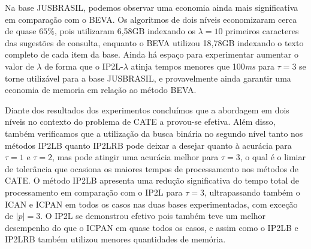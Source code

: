 Na base JUSBRASIL, podemos observar uma economia ainda mais significativa em comparação com o BEVA. Os algoritmos de dois níveis economizaram cerca de quase $65\%$, pois utilizaram 6,58GB indexando os $\lambda=10$ primeiros caracteres das sugestões de consulta, enquanto o BEVA utilizou 18,78GB indexando o texto completo de cada item da base. Ainda há espaço para experimentar aumentar o valor de $\lambda$ de forma que o IP2L-$\lambda$ atinja tempos menores que 100\textit{ms} para $\tau=3$ se torne utilizável para a base JUSBRASIL, e provavelmente ainda garantir uma economia de memoria em relação ao método BEVA. 

Diante dos resultados dos experimentos concluímos que a abordagem em dois níveis no contexto do problema de CATE a provou-se efetiva. Além disso, também verificamos que a utilização da busca binária no segundo nível tanto nos métodos IP2LB quanto IP2LRB pode deixar a desejar quanto à acurácia para $\tau=1$ e $\tau=2$, mas pode atingir uma acurácia melhor para $\tau=3$, o qual é o limiar de tolerância que ocasiona os maiores tempos de processamento nos métodos de CATE. O método IP2LB apresenta uma redução significativa do tempo total de processamento em comparação com o IP2L para $\tau=3$, ultrapassando também o ICAN e ICPAN em todos os casos nas duas bases experimentadas, com exceção de $|p|=3$. O IP2L se demonstrou efetivo pois também teve um melhor desempenho do que o ICPAN em quase todos os casos, e assim como o IP2LB e IP2LRB também utilizou menores quantidades de memória.


